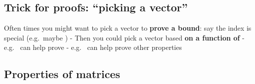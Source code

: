 \subsection*{Trick for proofs: ``picking a
  vector''}

Often times you might want to pick a vector to \textbf{prove a bound}:
say the index  is special (e.g.~maybe
)
- Then you could pick a vector  based \textbf{on a
  function of } -
e.g.~ can
help prove
-
e.g.~
can help prove other properties

\subsection*{Properties of matrices}

